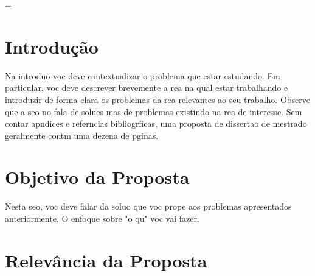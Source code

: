 \documentclass[a4paper,titlepage,12pt]{article}
\begin{document}

\pagestyle{plain}


\printnomenclature[1cm]
\newpage

\listoffigures
\newpage

\listoftables
\newpage

\tableofcontents
\newpage


\pagestyle{plain}
\setcounter{page}{1}

\pagestyle{fancy}
\addtolength{\headwidth}{\marginparsep}\addtolength{\headwidth}{\marginparwidth}\headwidth
= \textwidth
\renewcommand{\sectionmark}[1]{\markright{\thesection\ #1}}\lhead[\fancyplain{}{\bfseries\thepage}]%
         {\fancyplain{}{\emph{\rightmark}}}\rhead[\fancyplain{}{\bfseries\leftmark}]%
             {\fancyplain{}{\bfseries\thepage}}\cfoot{}



\section{Introdução}
\label{sec:introducao}

Na introduo voc deve contextualizar o problema que estar estudando. Em particular, voc deve descrever brevemente a rea na qual estar trabalhando e introduzir de forma clara os problemas da rea relevantes ao seu trabalho. Observe que a seo no fala de solues mas de problemas existindo na rea de interesse.
Sem contar apndices e referncias bibliogrficas, uma proposta de dissertao de mestrado geralmente contm uma dezena de pginas.

\section{Objetivo da Proposta}
\label{sec:objetivo}

Nesta seo, voc deve falar da soluo que voc prope aos problemas apresentados anteriormente. O enfoque  sobre "o qu" voc vai fazer.

\section{Relev\^{a}ncia da Proposta}
\label{sec:relev}
\end{document}

